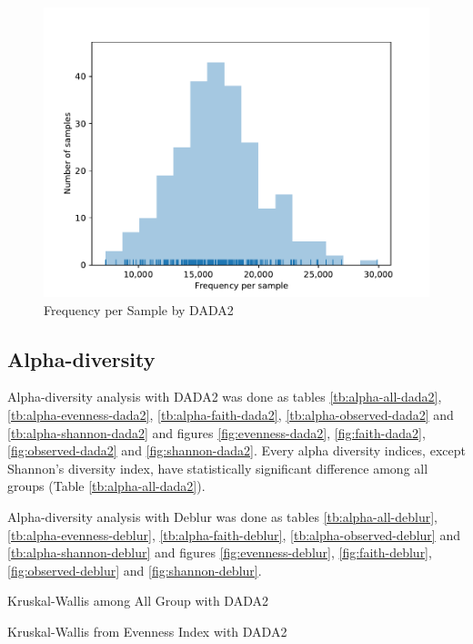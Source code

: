 \documentclass[a4paper]{article}
\begin{document}
            \begin{figure}[p]
                \centering
                \includegraphics[width=0.6 \linewidth]{figures/Rarefaction/Deblur.pdf}
                \caption{Frequency per Sample by DADA2}
                \label{fig:frequency-sample-deblur}
            \end{figure}

        \subsection{Alpha-diversity}
            Alpha-diversity analysis with DADA2 was done as tables \ref{tb:alpha-all-dada2}, \ref{tb:alpha-evenness-dada2}, \ref{tb:alpha-faith-dada2}, \ref{tb:alpha-observed-dada2} and \ref{tb:alpha-shannon-dada2} and figures \ref{fig:evenness-dada2}, \ref{fig:faith-dada2}, \ref{fig:observed-dada2} and \ref{fig:shannon-dada2}. Every alpha diversity indices, except Shannon's diversity index, have statistically significant difference among all groups (Table \ref{tb:alpha-all-dada2}).

            Alpha-diversity analysis with Deblur was done as tables \ref{tb:alpha-all-deblur}, \ref{tb:alpha-evenness-deblur}, \ref{tb:alpha-faith-deblur}, \ref{tb:alpha-observed-deblur} and \ref{tb:alpha-shannon-deblur} and figures \ref{fig:evenness-deblur}, \ref{fig:faith-deblur}, \ref{fig:observed-deblur} and \ref{fig:shannon-deblur}.

            \begin{table}[p]
                \centering
                \caption{Kruskal-Wallis among All Group with DADA2}
                \label{tb:alpha-all-dada2}
            \end{table}

            \begin{table}[p]
                \centering
                \caption{Kruskal-Wallis from Evenness Index with DADA2}
                \label{tb:alpha-evenness-dada2}
            \end{table}
\end{document}
